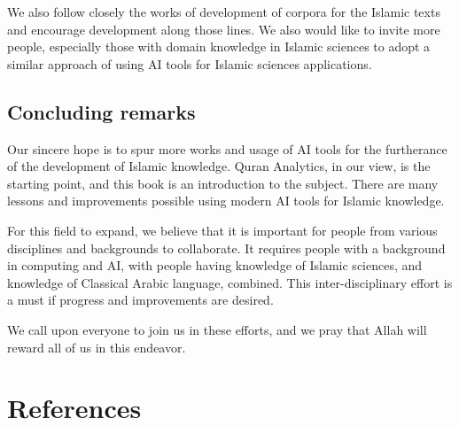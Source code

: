 \documentclass[
]{article}
\begin{document}
We also follow closely the works of development of corpora for the Islamic texts and encourage development along those lines. We also would like to invite more people, especially those with domain knowledge in Islamic sciences to adopt a similar approach of using AI tools for Islamic sciences applications.

\hypertarget{concluding-remarks}{%
\subsection*{Concluding remarks}\label{concluding-remarks}}

Our sincere hope is to spur more works and usage of AI tools for the furtherance of the development of Islamic knowledge. Quran Analytics, in our view, is the starting point, and this book is an introduction to the subject. There are many lessons and improvements possible using modern AI tools for Islamic knowledge.

For this field to expand, we believe that it is important for people from various disciplines and backgrounds to collaborate. It requires people with a background in computing and AI, with people having knowledge of Islamic sciences, and knowledge of Classical Arabic language, combined. This inter-disciplinary effort is a must if progress and improvements are desired.

We call upon everyone to join us in these efforts, and we pray that Allah will reward all of us in this endeavor.

\hypertarget{references}{%
\section*{References}\label{references}}

  
\end{document}
